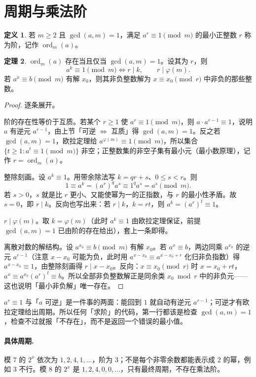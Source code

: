 \documentclass[UTF8,a4paper,11pt,twoside,openright,fontset=fandol]{ctexbook}
\theoremstyle{definition}
\newtheorem{definition}{定义}[chapter]
\newtheorem{theorem}[definition]{定理}
\newcommand{\ord}{\operatorname{ord}}
\begin{document}
\section{周期与乘法阶}
\begin{definition}
若 $m\ge2$ 且 $\gcd(a,m)=1$，满足 $a^r\equiv1\pmod m$ 的最小正整数 $r$ 称为阶，记作 $\ord_m(a)$。
\end{definition}
\begin{theorem}
$\ord_m(a)$ 存在当且仅当 $\gcd(a,m)=1$。设其为 $r$，则
\[
 a^k\equiv1\pmod m\iff r\mid k,\qquad r\mid\varphi(m).
\]
若 $a^x\equiv b\pmod m$ 有解 $x_0$，则其非负整数解为 $x\equiv x_0\pmod r$ 中非负的那些整数。
\end{theorem}
\begin{proof}
逐条展开。

阶的存在性等价于互质。若某个 $r\ge1$ 使 $a^r\equiv1\pmod m$，则 $a\cdot a^{r-1}\equiv1$，说明 $a$ 有逆元 $a^{r-1}$，由上节「可逆 $\iff$ 互质」得 $\gcd(a,m)=1$。反之若 $\gcd(a,m)=1$，欧拉定理给 $a^{\varphi(m)}\equiv1\pmod m$，所以集合 $\{t\ge1:a^t\equiv1\pmod m\}$ 非空；正整数集的非空子集有最小元（最小数原理），记作 $r=\ord_m(a)$。

整除刻画。设 $a^k\equiv1$。用带余除法写 $k=qr+s$、$0\le s<r$。则
\[
 1\equiv a^k=(a^r)^qa^s\equiv1^q a^s=a^s\pmod m.
\]
若 $s>0$，$s$ 就是比 $r$ 更小、又能使幂为一的正指数，与 $r$ 的最小性矛盾。故 $s=0$，即 $r\mid k$。反向也写出来：若 $r\mid k$，$k=rt$，则 $a^k=(a^r)^t\equiv1$。

$r\mid\varphi(m)$。取 $k=\varphi(m)$（此时 $a^k\equiv1$ 由欧拉定理保证，前提 $\gcd(a,m)=1$ 已由阶的存在给出），套上一条即得。

离散对数的解结构。设 $a^{x_0}\equiv b\pmod m$ 有解 $x_0$。若 $a^x\equiv b$，两边同乘 $a^{x_0}$ 的逆元 $a^{r-1}$（注意 $x-x_0$ 可能为负，此时用 $a^{x-x_0}\equiv a^{x-x_0+r}$ 化归非负指数）得 $a^{x-x_0}\equiv1$，由整除刻画得 $r\mid x-x_0$。反向：$x\equiv x_0\pmod r$ 时 $x=x_0+rt$，$a^x\equiv a^{x_0}(a^r)^t\equiv b$。所以全部非负整数解正是同余类 $x_0\bmod r$ 中的非负元——这也说明「最小非负解」唯一存在。
\end{proof}

\begin{tip}[为什么：求阶前先查 $\gcd(a,m)=1$]
$a^r\equiv1$ 与「$a$ 可逆」是一件事的两面：能回到 $1$ 就自动有逆元 $a^{r-1}$；可逆才有欧拉定理给出周期。所以任何「求阶」的代码，第一行都该是检查 $\gcd(a,m)=1$，检查不过就报「不存在」，而不是返回一个错误的最小值。
\end{tip}


\paragraph{具体周期.} 模 $7$ 的 $2^x$ 依次为 $1,2,4,1,\ldots$，阶为 $3$；不是每个非零余数都能表示成 $2$ 的幂，例如 $3$ 不行。模 $8$ 的 $2^x$ 是 $1,2,4,0,0,\ldots$，只有最终周期，不存在乘法阶。
\end{document}
